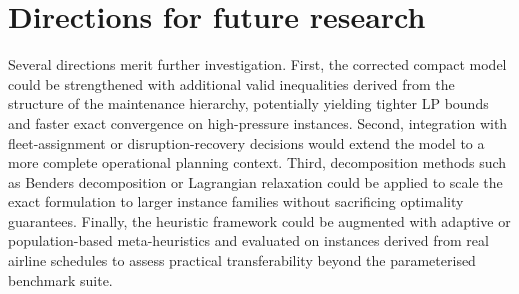 \section*{Directions for future research}

Several directions merit further investigation. First, the corrected compact model could be strengthened with additional valid inequalities derived from the structure of the maintenance hierarchy, potentially yielding tighter LP bounds and faster exact convergence on high-pressure instances. Second, integration with fleet-assignment or disruption-recovery decisions would extend the model to a more complete operational planning context. Third, decomposition methods such as Benders decomposition or Lagrangian relaxation could be applied to scale the exact formulation to larger instance families without sacrificing optimality guarantees. Finally, the heuristic framework could be augmented with adaptive or population-based meta-heuristics and evaluated on instances derived from real airline schedules to assess practical transferability beyond the parameterised benchmark suite.
